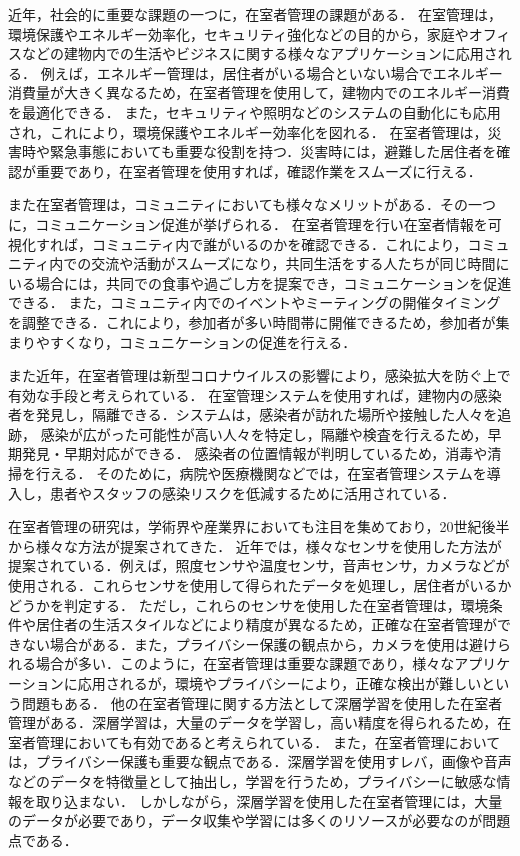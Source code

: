 近年，社会的に重要な課題の一つに，在室者管理の課題がある．
在室管理は，環境保護やエネルギー効率化，セキュリティ強化などの目的から，家庭やオフィスなどの建物内での生活やビジネスに関する様々なアプリケーションに応用される．
例えば，エネルギー管理は，居住者がいる場合といない場合でエネルギー消費量が大きく異なるため，在室者管理を使用して，建物内でのエネルギー消費を最適化できる．
また，セキュリティや照明などのシステムの自動化にも応用され，これにより，環境保護やエネルギー効率化を図れる．
在室者管理は，災害時や緊急事態においても重要な役割を持つ．災害時には，避難した居住者を確認が重要であり，在室者管理を使用すれば，確認作業をスムーズに行える．

また在室者管理は，コミュニティにおいても様々なメリットがある．その一つに，コミュニケーション促進が挙げられる．
在室者管理を行い在室者情報を可視化すれば，コミュニティ内で誰がいるのかを確認できる．これにより，コミュニティ内での交流や活動がスムーズになり，共同生活をする人たちが同じ時間にいる場合には，共同での食事や過ごし方を提案でき，コミュニケーションを促進できる．
また，コミュニティ内でのイベントやミーティングの開催タイミングを調整できる．これにより，参加者が多い時間帯に開催できるため，参加者が集まりやすくなり，コミュニケーションの促進を行える．


また近年，在室者管理は新型コロナウイルスの影響により，感染拡大を防ぐ上で有効な手段と考えられている．
在室管理システムを使用すれば，建物内の感染者を発見し，隔離できる．システムは，感染者が訪れた場所や接触した人々を追跡，
感染が広がった可能性が高い人々を特定し，隔離や検査を行えるため，早期発見・早期対応ができる．
感染者の位置情報が判明しているため，消毒や清掃を行える．
そのために，病院や医療機関などでは，在室者管理システムを導入し，患者やスタッフの感染リスクを低減するために活用されている．

在室者管理の研究は，学術界や産業界においても注目を集めており，20世紀後半から様々な方法が提案されてきた．
近年では，様々なセンサを使用した方法が提案されている．例えば，照度センサや温度センサ，音声センサ，カメラなどが使用される．これらセンサを使用して得られたデータを処理し，居住者がいるかどうかを判定する．
ただし，これらのセンサを使用した在室者管理は，環境条件や居住者の生活スタイルなどにより精度が異なるため，正確な在室者管理ができない場合がある．また，プライバシー保護の観点から，カメラを使用は避けられる場合が多い．このように，在室者管理は重要な課題であり，様々なアプリケーションに応用されるが，環境やプライバシーにより，正確な検出が難しいという問題もある．
他の在室者管理に関する方法として深層学習を使用した在室者管理がある．深層学習は，大量のデータを学習し，高い精度を得られるため，在室者管理においても有効であると考えられている．
また，在室者管理においては，プライバシー保護も重要な観点である．深層学習を使用すレバ，画像や音声などのデータを特徴量として抽出し，学習を行うため，プライバシーに敏感な情報を取り込まない．
しかしながら，深層学習を使用した在室者管理には，大量のデータが必要であり，データ収集や学習には多くのリソースが必要なのが問題点である．

